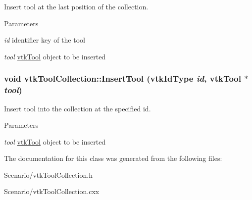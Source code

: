 Insert tool at the last position of the collection. 
\begin{DoxyParams}{Parameters}
\item[{\em id}]identifier key of the tool \item[{\em tool}]\hyperlink{classvtkTool}{vtkTool} object to be inserted \end{DoxyParams}
\hypertarget{classvtkToolCollection_a7bf8d8954ceaafb5c5985eac7d96eb18}{
\subsubsection[{InsertTool}]{\setlength{\rightskip}{0pt plus 5cm}void vtkToolCollection::InsertTool (vtkIdType {\em id}, \/  {\bf vtkTool} $\ast$ {\em tool})}}
\label{classvtkToolCollection_a7bf8d8954ceaafb5c5985eac7d96eb18}


Insert tool into the collection at the specified id. 
\begin{DoxyParams}{Parameters}
\item[{\em tool}]\hyperlink{classvtkTool}{vtkTool} object to be inserted \end{DoxyParams}


The documentation for this class was generated from the following files:\begin{DoxyCompactItemize}
\item 
Scenario/vtkToolCollection.h\item 
Scenario/vtkToolCollection.cxx\end{DoxyCompactItemize}
